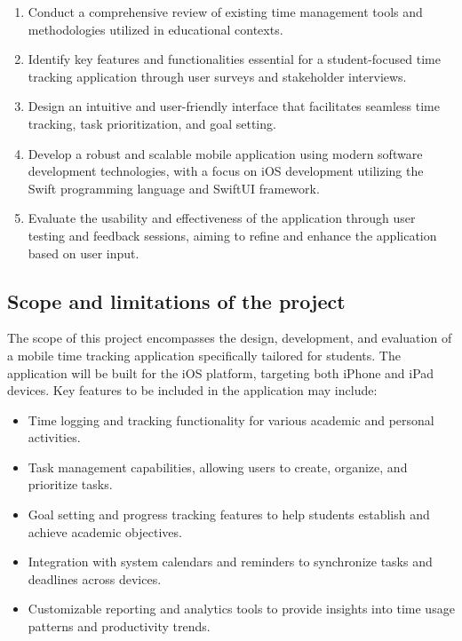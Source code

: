 \documentclass[
  biblatex,
  language=english,
  figures=false,
  sourcecodes,
  glossaries,
  index
]{kidiplom}
\begin{document}
\begin{enumerate}
    \item Conduct a comprehensive review of existing time management tools and methodologies utilized in educational contexts.
    \item Identify key features and functionalities essential for a student-focused time tracking application through user surveys and stakeholder interviews.
    \item Design an intuitive and user-friendly interface that facilitates seamless time tracking, task prioritization, and goal setting.
    \item Develop a robust and scalable mobile application using modern software development technologies, with a focus on iOS development utilizing the Swift programming language and SwiftUI framework.
    \item Evaluate the usability and effectiveness of the application through user testing and feedback sessions, aiming to refine and enhance the application based on user input.
\end{enumerate}

\subsection{Scope and limitations of the project}
The scope of this project encompasses the design, development, and evaluation of a mobile time tracking application specifically tailored for students. The application will be built for the iOS platform, targeting both iPhone and iPad devices. Key features to be included in the application may include:
\begin{itemize}
    \item Time logging and tracking functionality for various academic and personal activities.
    \item Task management capabilities, allowing users to create, organize, and prioritize tasks.
    \item Goal setting and progress tracking features to help students establish and achieve academic objectives.
    \item Integration with system calendars and reminders to synchronize tasks and deadlines across devices.
    \item Customizable reporting and analytics tools to provide insights into time usage patterns and productivity trends.
\end{itemize}
\end{document}
